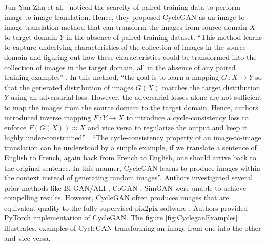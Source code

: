 Jun-Yan Zhu et al.\ \cite{zhu2020unpaired} noticed the scarcity of paired training data to perform image-to-image translation. Hence, they proposed \ac{CycleGAN} as an image-to-image translation method that can transform the images from source domain $X$ to target domain $Y$ in the absence of paired training dataset. ``This method learns to capture underlying characteristics of the collection of images in the source domain and figuring out how these characteristics could be transformed into the collection of images in the target domain, all in the absence of any paired training examples'' \cite{zhu2020unpaired}. In this method, ``the goal is to learn a mapping $G\ \colon X \rightarrow Y$ so that the generated distribution of images $G(X)$ matches the target distribution $Y$ using an adversarial loss. However, the adversarial losses alone are not sufficient to map the images from the source domain to the target domain. Hence, authors introduced inverse mapping $F\ \colon Y \rightarrow X$ to introduce a cycle-consistency loss to enforce $F(G(X))\approx X$ and vice versa to regularize the output and keep it highly under-constrained'' \cite{zhu2020unpaired}. ``The cycle-consistency property of an image-to-image translation can be understood by a simple example, if we translate a sentence of English to French, again back from French to English, one should arrive back to the original sentence. In this manner, \ac{CycleGAN} learns to produce images within the context instead of generating random images''\footnotemark. Authors investigated several prior methods like Bi-GAN/ALI \cite{donahue2017adversarial} \cite{dumoulin2017adversarially}, CoGAN \cite{liu2016coupled}, SimGAN \cite{shrivastava2017learning} were unable to achieve compelling results. However, \ac{CycleGAN} often produces images that are equivalent quality to the fully supervised pix2pix software \cite{isola2018imagetoimage}. Authors provided \href{https://github.com/junyanz/pytorch-CycleGAN-and-pix2pix}{PyTorch} implementation of \ac{CycleGAN}. The figure \ref{fig:CycleganExamples} illustrates, examples of \ac{CycleGAN} transforming an image from one into the other and vice versa.


